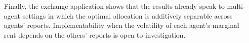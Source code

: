 \documentclass[12pt]{article}
\begin{document}
Finally, the
exchange application shows that the results already speak to multi-agent
settings in which the optimal allocation is additively separable across
agents' reports. Implementability when the volatility of each agent's marginal rent
depends on the others' reports is open to investigation.

\end{document}
